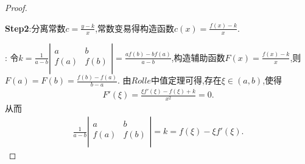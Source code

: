 \documentclass[lang=cn,newtx,10pt,scheme=chinese]{../Template/elegantbook}
\begin{document}
\begin{proof}
\begin{note}
        \textbf{Step2}:分离常数$c=\frac{y-k}{x}$,常数变易得构造函数$c\left( x \right) =\frac{f\left( x \right) -k}{x}$.
    \end{note}
    {\color{blue} }:
    令$k=\frac{1}{a-b}\left| \begin{matrix}
        a&		b\\
        f(a)&		f(b)\\
    \end{matrix} \right|=\frac{af\left( b \right) -bf\left( a \right)}{a-b}$,构造辅助函数$F\left( x \right) =\frac{f\left( x \right) -k}{x}$,则$F\left( a \right) =F\left( b \right) =\frac{f\left( b \right) -f\left( a \right)}{b-a}$.
    由$Rolle$中值定理可得,存在$\xi\in(a,b)$,使得
    \begin{align}
        F'\left( \xi \right) =\frac{\xi f'\left( \xi \right) -f\left( \xi \right) +k}{x^2}=0.
        \nonumber
    \end{align}
    从而
    \begin{align}
        \frac{1}{a-b}\left| \begin{matrix}
            a&		b\\
            f(a)&		f(b)\\
        \end{matrix} \right|=k=f\left( \xi \right) -\xi f'\left( \xi \right) .
        \nonumber
    \end{align}
\end{proof}
\end{document}
